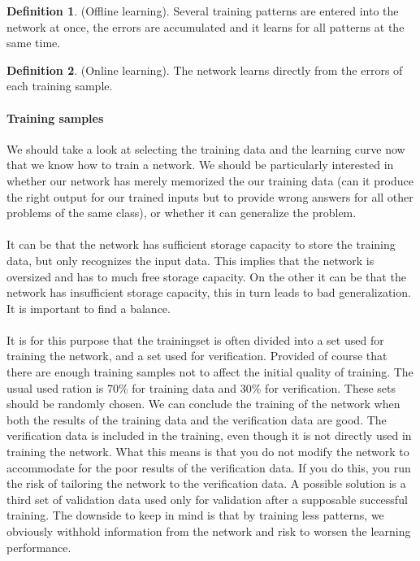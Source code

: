 \documentclass[pdftex,a4paper,12pt,twoside]{report}
\theoremstyle{plain} \newtheorem{theorem}{Theorem} \newtheorem{proposition}{Proposition} \newtheorem{lemma}{Lemma} \newtheorem*{corollary}{Corollary}
\theoremstyle{definition} \newtheorem{definition}{Definition} \newtheorem{conjecture}{Conjecture} \newtheorem*{example}{Example} \newtheorem{algorithm}{Algorithm}
\theoremstyle{remark} \newtheorem*{remark}{Remark} \newtheorem*{note}{Note} \newtheorem{case}{Case}
\begin{document}
\begin{definition}
(Offline learning). Several training patterns are entered into the
network at once, the errors are accumulated and it learns for all patterns at the same
time.
\end{definition}
\begin{definition}
(Online learning). The network learns directly from the errors of each
training sample.
\end{definition}
\paragraph{Training samples}
We should take a look at selecting the training data and the learning curve now that we know how to train a network. We should be particularly interested in whether our network has merely memorized the our training data (can it produce the right output for our trained inputs but to provide wrong answers for all other problems of the same class), or whether it can generalize the problem.\\\\It can be that the network has sufficient storage capacity to store the training data, but only recognizes the input data. This implies that the network is oversized and has to much free storage capacity. On the other it can be that the network has insufficient storage capacity, this in turn leads to bad generalization. It is important to find a balance.\\\\It is for this purpose that the trainingset is often divided into a set used for training the network, and a set used for verification. Provided of course that there are enough training samples not to affect the initial quality of training. The usual used ration is 70\% for training data and 30\% for verification. These sets should be randomly chosen. We can conclude the training of the network when both the results of the training data and the verification data are good. The verification data is included in the training, even though it is not directly used in training the network. What this means is that you do not modify the network to accommodate for the poor results of the verification data. If you do this, you run the risk of tailoring the network to the verification data. A  possible solution is a third set of validation data used only for validation after a supposable successful training. The downside to keep in mind is that by training less patterns, we obviously withhold information from the network and risk to worsen the learning performance.
\end{document}
